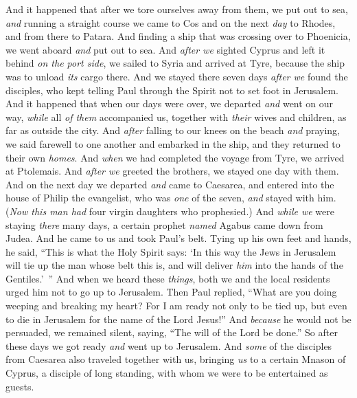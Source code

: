 \begin{biblechapter} %
 And it happened that after we tore ourselves away from them, we put out to sea, \textit{and} running a straight course we came to Cos and on the next \textit{day} to Rhodes, and from there to Patara.
\verse And finding a ship that was crossing over to Phoenicia, we went aboard \textit{and} put out to sea.
\verse And \textit{after we} sighted Cyprus and left it behind \textit{on the port side}, we sailed to Syria and arrived at Tyre, because the ship was to unload \textit{its} cargo there.
\verse And we stayed there seven days \textit{after we} found the disciples, who kept telling Paul through the Spirit not to set foot in Jerusalem.
\verse And it happened that when our days were over, we departed \textit{and} went on our way, \textit{while} all \textit{of them} accompanied us, together with \textit{their} wives and children, as far as outside the city. And \textit{after} falling to our knees on the beach \textit{and} praying,
\verse we said farewell to one another and embarked in the ship, and they returned to their own \textit{homes}.
\verse And \textit{when} we had completed the voyage from Tyre, we arrived at Ptolemais. And \textit{after we} greeted the brothers, we stayed one day with them.
\verse And on the next day we departed \textit{and} came to Caesarea, and entered into the house of Philip the evangelist, who was \textit{one} of the seven, \textit{and} stayed with him.
\verse (\textit{Now this man had} four virgin daughters who prophesied.)
\verse And \textit{while we} were staying \textit{there} many days, a certain prophet \textit{named} Agabus came down from Judea.
\verse And he came to us and took Paul’s belt. Tying up his own feet and hands, he said, “This is what the Holy Spirit says: ‘In this way the Jews in Jerusalem will tie up the man whose belt this is, and will deliver \textit{him} into the hands of the Gentiles.’ ”
\verse And when we heard these \textit{things}, both we and the local residents urged him not to go up to Jerusalem.
\verse Then Paul replied, “What are you doing weeping and breaking my heart? For I am ready not only to be tied up, but even to die in Jerusalem for the name of the Lord Jesus!”
\verse And \textit{because} he would not be persuaded, we remained silent, saying, “The will of the Lord be done.”
\verse So after these days we got ready \textit{and} went up to Jerusalem.
\verse And \textit{some} of the disciples from Caesarea also traveled together with us, bringing \textit{us} to a certain Mnason of Cyprus, a disciple of long standing, with whom we were to be entertained as guests.

\end{biblechapter}

